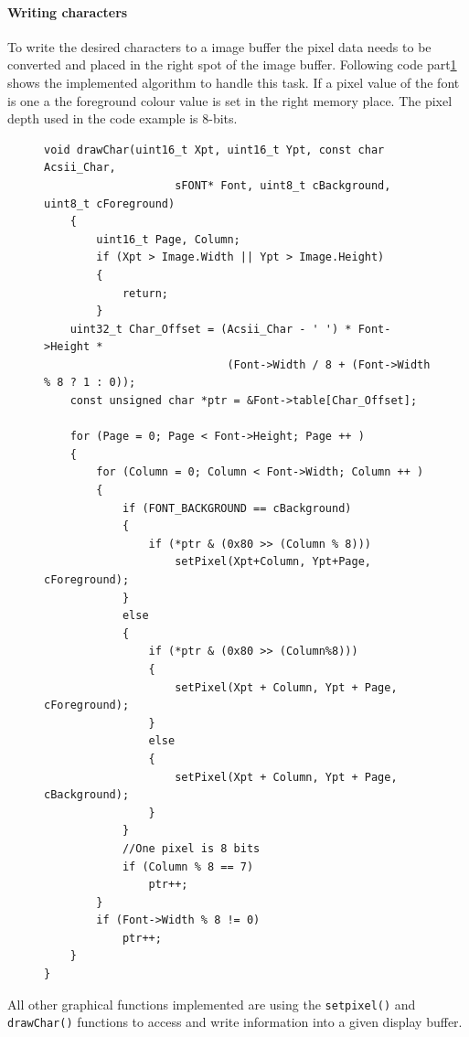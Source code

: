 \paragraph{Writing characters}
To write the desired characters to a image buffer the pixel data needs to be converted and placed in the right spot of the image buffer. Following code part\ref{software:drawchar} shows the implemented algorithm to handle this task. If a pixel value of the font is one a the foreground colour value is set in the right memory place. The pixel depth used in the code example is 8-bits. 
\begin{figure}[H]
	\begin{lstlisting}
void drawChar(uint16_t Xpt, uint16_t Ypt, const char Acsii_Char,
					sFONT* Font, uint8_t cBackground, uint8_t cForeground)
	{
		uint16_t Page, Column;
		if (Xpt > Image.Width || Ypt > Image.Height) 
		{
			return;
		}
	uint32_t Char_Offset = (Acsii_Char - ' ') * Font->Height * 
							(Font->Width / 8 + (Font->Width % 8 ? 1 : 0));
	const unsigned char *ptr = &Font->table[Char_Offset];
	
	for (Page = 0; Page < Font->Height; Page ++ ) 
	{
		for (Column = 0; Column < Font->Width; Column ++ ) 
		{
			if (FONT_BACKGROUND == cBackground) 
			{ 
				if (*ptr & (0x80 >> (Column % 8)))
					setPixel(Xpt+Column, Ypt+Page, cForeground);
			} 
			else 
			{
				if (*ptr & (0x80 >> (Column%8))) 
				{
					setPixel(Xpt + Column, Ypt + Page, cForeground);					
				} 
				else 
				{
					setPixel(Xpt + Column, Ypt + Page, cBackground);
				}
			}
			//One pixel is 8 bits
			if (Column % 8 == 7)
				ptr++;
		}
		if (Font->Width % 8 != 0)
			ptr++;
	}
}
	\end{lstlisting}
	\label{software:drawchar}
\end{figure}

All other graphical functions implemented are using the \texttt{setpixel()} and \texttt{drawChar()} functions to access and write information into a given display buffer. 


%	


